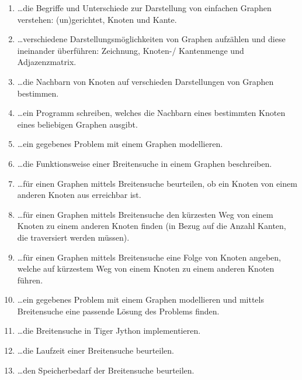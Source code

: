 \begin{enumerate}
\item \dots die Begriffe und Unterschiede zur Darstellung von einfachen Graphen verstehen: (un)gerichtet, Knoten und Kante.

\item \dots verschiedene Darstellungsmöglichkeiten von Graphen aufzählen und diese ineinander überführen: Zeichnung, Knoten-/ Kantenmenge und Adjazenzmatrix.

\item \dots die Nachbarn von Knoten auf verschieden Darstellungen von Graphen bestimmen. 

\item \dots ein Programm schreiben, welches die Nachbarn eines bestimmten Knoten eines beliebigen Graphen ausgibt.

\item\dots ein gegebenes Problem mit einem Graphen modellieren.
 
\item \dots die Funktionsweise einer Breitensuche in einem Graphen beschreiben.

\item\dots f\"ur einen Graphen mittels Breitensuche beurteilen, ob ein Knoten von einem anderen Knoten aus erreichbar ist.

\item\dots f\"ur einen Graphen mittels Breitensuche den k\"urzesten Weg von einem Knoten zu einem anderen Knoten finden (in Bezug auf die Anzahl Kanten, die traversiert werden m\"ussen).

\item\dots f\"ur einen Graphen mittels Breitensuche eine Folge von Knoten angeben, welche auf k\"urzestem Weg von einem Knoten zu einem anderen Knoten f\"uhren.

\item \dots ein gegebenes Problem mit einem Graphen modellieren und mittels Breitensuche eine passende Lösung des Problems finden.

\item \dots die Breitensuche in Tiger Jython implementieren.

\item \dots die Laufzeit einer Breitensuche beurteilen.

\item \dots den Speicherbedarf der Breitensuche beurteilen.


\end{enumerate}

